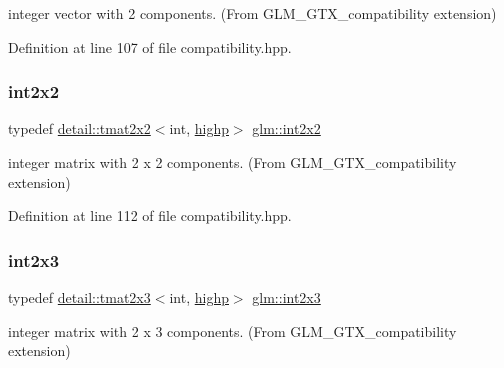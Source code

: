 integer vector with 2 components. (From G\+L\+M\+\_\+\+G\+T\+X\+\_\+compatibility extension) 



Definition at line 107 of file compatibility.\+hpp.

\mbox{\label{group__gtx__compatibility_ga7762d2b809aab75003e7e7873ca74a2f}} 
\subsubsection{\texorpdfstring{int2x2}{int2x2}}
{\footnotesize\ttfamily typedef \hyperlink{structglm_1_1detail_1_1tmat2x2}{detail\+::tmat2x2}$<$int, \hyperlink{namespaceglm_a0f04f086094c747d227af4425893f545ac6f7eab42eacbb10d59a58e95e362074}{highp}$>$ \hyperlink{group__gtx__compatibility_ga7762d2b809aab75003e7e7873ca74a2f}{glm\+::int2x2}}



integer matrix with 2 x 2 components. (From G\+L\+M\+\_\+\+G\+T\+X\+\_\+compatibility extension) 



Definition at line 112 of file compatibility.\+hpp.

\mbox{\label{group__gtx__compatibility_ga42c3d6e4924de559104b9ca2b127c9ac}} 
\subsubsection{\texorpdfstring{int2x3}{int2x3}}
{\footnotesize\ttfamily typedef \hyperlink{structglm_1_1detail_1_1tmat2x3}{detail\+::tmat2x3}$<$int, \hyperlink{namespaceglm_a0f04f086094c747d227af4425893f545ac6f7eab42eacbb10d59a58e95e362074}{highp}$>$ \hyperlink{group__gtx__compatibility_ga42c3d6e4924de559104b9ca2b127c9ac}{glm\+::int2x3}}



integer matrix with 2 x 3 components. (From G\+L\+M\+\_\+\+G\+T\+X\+\_\+compatibility extension) 



